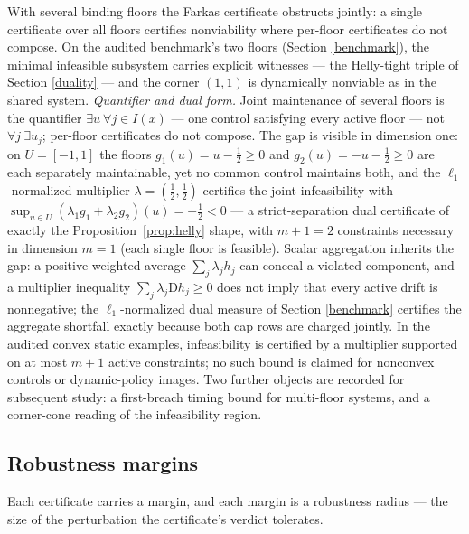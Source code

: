 \documentclass[10pt,twocolumn]{article}
\theoremstyle{definition}
\begin{document}
With several binding floors the Farkas certificate obstructs jointly: a
single certificate over all floors certifies nonviability where
per-floor certificates do not compose. On the audited benchmark's two
floors (Section \ref{benchmark}), the minimal infeasible subsystem
carries explicit witnesses --- the Helly-tight triple of Section
\ref{duality} --- and the corner \((1,1)\) is dynamically nonviable
as in the shared system. \emph{Quantifier and dual form.} Joint maintenance of several floors is the quantifier \(\exists u\ \forall j \in I(x)\) --- one control satisfying every active floor --- not \(\forall j\ \exists u_j\); per-floor certificates do not compose. The gap is visible in dimension one: on \(U = [-1, 1]\) the floors \(g_1(u) = u - \tfrac12 \ge 0\) and \(g_2(u) = -u - \tfrac12 \ge 0\) are each separately maintainable, yet no common control maintains both, and the \(\ell_1\)-normalized multiplier \(\lambda = (\tfrac12, \tfrac12)\) certifies the joint infeasibility with \(\sup_{u \in U}(\lambda_1 g_1 + \lambda_2 g_2)(u) = -\tfrac12 < 0\) --- a strict-separation dual certificate of exactly the Proposition~\ref{prop:helly} shape, with \(m + 1 = 2\) constraints necessary in dimension \(m = 1\) (each single floor is feasible). Scalar aggregation inherits the gap: a positive weighted average \(\sum_j \lambda_j h_j\) can conceal a violated component, and a multiplier inequality \(\sum_j \lambda_j \mathrm{D}h_j \ge 0\) does not imply that every active drift is nonnegative; the \(\ell_1\)-normalized dual measure of Section \ref{benchmark} certifies the aggregate shortfall exactly because both cap rows are charged jointly. In the audited convex static examples, infeasibility is certified by a multiplier supported on at most \(m + 1\) active constraints; no such bound is claimed for nonconvex controls or dynamic-policy images. Two further objects are recorded for subsequent study: a
first-breach timing bound for multi-floor systems, and a corner-cone
reading of the infeasibility region.

\subsection{Robustness margins}\label{margins}

Each certificate carries a margin, and each margin is a robustness
radius --- the size of the perturbation the certificate's verdict
tolerates.
\end{document}
